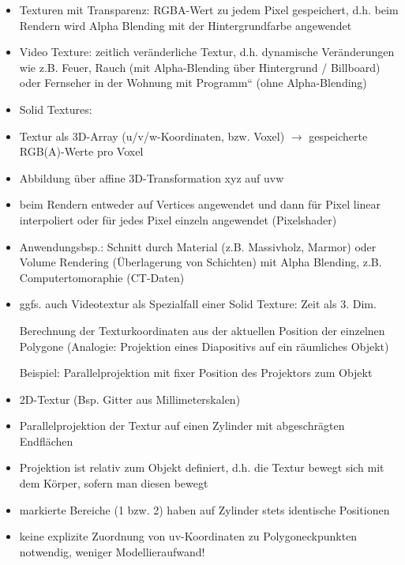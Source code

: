\documentclass[10pt,landscape]{article}
\begin{document}
\begin{multicols}{3}
{\begin{itemize}
  
  \item Texturen mit Transparenz: RGBA-Wert zu jedem Pixel gespeichert, d.h. beim Rendern wird Alpha Blending mit der Hintergrundfarbe angewendet
  \item Video Texture: zeitlich veränderliche Textur, d.h. dynamische Veränderungen wie z.B. Feuer, Rauch (mit Alpha-Blending über Hintergrund / Billboard) oder Fernseher in der Wohnung mit Programm“ (ohne Alpha-Blending)
  \item Solid Textures:
  \item Textur als 3D-Array (u/v/w-Koordinaten, bzw. Voxel) $\rightarrow$ gespeicherte RGB(A)-Werte pro Voxel
  \item Abbildung über affine 3D-Transformation xyz auf uvw
  \item beim Rendern entweder auf Vertices angewendet und dann für Pixel linear interpoliert oder für jedes Pixel einzeln angewendet (Pixelshader)
  \item Anwendungsbsp.: Schnitt durch Material (z.B. Massivholz, Marmor) oder Volume Rendering (Überlagerung von Schichten) mit Alpha Blending, z.B. Computertomoraphie (CT-Daten)
  \item ggfs. auch Videotextur als Spezialfall einer Solid Texture: Zeit als 3. Dim.
  
  Berechnung der Texturkoordinaten aus der aktuellen Position der einzelnen Polygone (Analogie: Projektion eines Diapositivs auf ein räumliches Objekt)
  
  Beispiel: Parallelprojektion mit fixer Position des Projektors zum Objekt
  \item 2D-Textur (Bsp. Gitter aus Millimeterskalen)
  \item Parallelprojektion der Textur auf einen Zylinder mit abgeschrägten Endflächen
  \item Projektion ist relativ zum Objekt definiert, d.h. die Textur bewegt sich mit dem Körper, sofern man diesen bewegt
  \item markierte Bereiche (1 bzw. 2) haben auf Zylinder stets identische Positionen
  \item keine explizite Zuordnung von uv-Koordinaten zu Polygoneckpunkten notwendig, weniger Modellieraufwand!
  

\end{itemize}}
\end{multicols}
\end{document}
